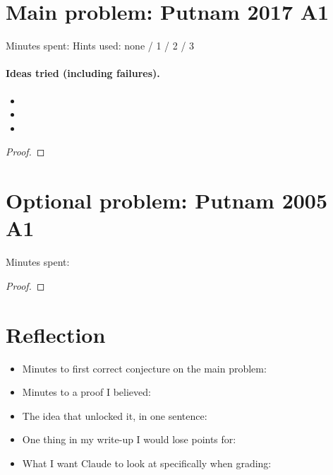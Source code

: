 \documentclass[11pt]{article}
\begin{document}

\section*{Main problem: Putnam 2017 A1}
Minutes spent: \blank[1cm] \qquad Hints used: none / 1 / 2 / 3

\paragraph{Ideas tried (including failures).}
\begin{itemize}
  \item
  \item
  \item
\end{itemize}

\begin{answer}
\end{answer}

\begin{proof}
\end{proof}

\section*{Optional problem: Putnam 2005 A1}
Minutes spent: \blank[1cm]

\begin{proof}
\end{proof}

\section*{Reflection}
\begin{itemize}
  \item Minutes to first correct conjecture on the main problem: \blank[1cm]
  \item Minutes to a proof I believed: \blank[1cm]
  \item The idea that unlocked it, in one sentence:
  \item One thing in my write-up I would lose points for:
  \item What I want Claude to look at specifically when grading:
\end{itemize}
\end{document}
